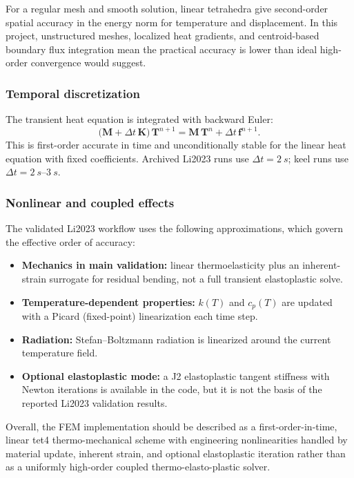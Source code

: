   For a regular mesh and smooth solution, linear tetrahedra give second-order spatial accuracy in the energy norm for temperature and displacement. In this project, unstructured meshes, localized heat gradients, and centroid-based boundary flux integration mean the practical accuracy is lower than ideal high-order convergence would suggest.

  \subsubsection{Temporal discretization}
  The transient heat equation is integrated with backward Euler:
  \begin{equation}
  \bigl(\mathbf{M} + \Delta t\,\mathbf{K}\bigr)\,\mathbf{T}^{n+1} = \mathbf{M}\,\mathbf{T}^{n} + \Delta t\,\mathbf{f}^{n+1}.
  \end{equation}
  This is first-order accurate in time and unconditionally stable for the linear heat equation with fixed coefficients. Archived Li2023 runs use $\Delta t=\SI{2}{s}$; keel runs use $\Delta t=\SIrange{2}{3}{s}$.

  \subsubsection{Nonlinear and coupled effects}
  The validated Li2023 workflow uses the following approximations, which govern the effective order of accuracy:
  \begin{itemize}
    \item \textbf{Mechanics in main validation:} linear thermoelasticity plus an inherent-strain surrogate for residual bending, not a full transient elastoplastic solve.
    \item \textbf{Temperature-dependent properties:} $k(T)$ and $c_p(T)$ are updated with a Picard (fixed-point) linearization each time step.
    \item \textbf{Radiation:} Stefan--Boltzmann radiation is linearized around the current temperature field.
    \item \textbf{Optional elastoplastic mode:} a J2 elastoplastic tangent stiffness with Newton iterations is available in the code, but it is not the basis of the reported Li2023 validation results.
  \end{itemize}

  Overall, the FEM implementation should be described as a first-order-in-time, linear tet4 thermo-mechanical scheme with engineering nonlinearities handled by material update, inherent strain, and optional elastoplastic iteration rather than as a uniformly high-order coupled thermo-elasto-plastic solver.

